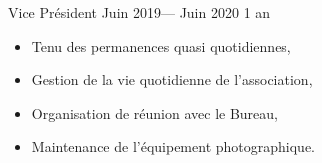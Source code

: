 \volunteerposition%
{Vice Président}%
{Juin 2019--- Juin 2020}%
{1 an}%
{
	\begin{itemize}
    \item Tenu des permanences quasi quotidiennes,
    \item Gestion de la vie quotidienne de l'association,
    \item Organisation de réunion avec le Bureau,
    \item Maintenance de l'équipement photographique.
	\end{itemize}
}
